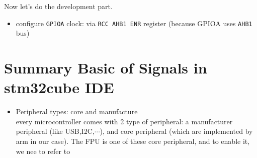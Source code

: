 \documentclass[12pt,a4paper]{book}
\begin{document}
Now let's do the development part.

\begin{itemize}
    \item configure \verb|GPIOA| clock: via \verb|RCC AHB1 ENR| register (because GPIOA uses \verb|AHB1| bus)
\end{itemize}


\newpage

\section{Summary Basic of Signals in stm32cube IDE}

\begin{itemize}
    
\item Peripheral types: core and manufacture \\

every microcontroller comes with 2 type of peripheral: a manufacturer peripheral (like USB,I2C,$\cdots$), and core peripheral (which are implemented by arm in our case). The FPU is one of these core peripheral, and to enable it, we nee to refer to 





\end{itemize}
\end{document}
